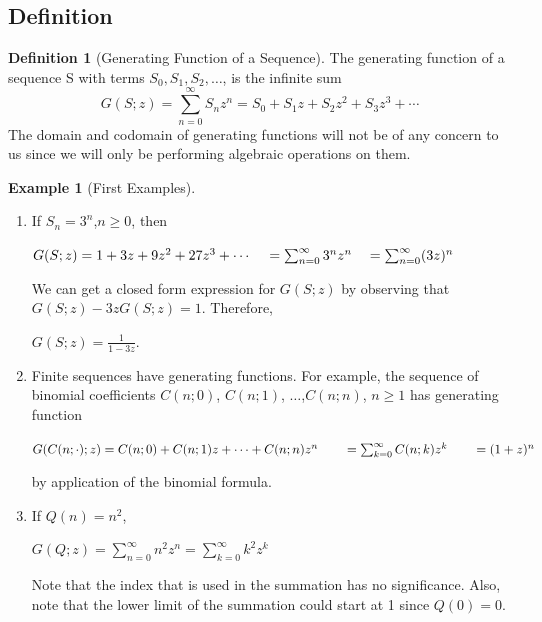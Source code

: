 \documentclass[10pt,]{book}
\theoremstyle{plain}
\theoremstyle{definition}
\newtheorem{definition}[theorem]{Definition}
\theoremstyle{definition}
\theoremstyle{definition}
\newtheorem{example}[theorem]{Example}
\theoremstyle{definition}
\numberwithin{equation}{section}
\begin{document}
\subsection[Definition]{Definition}\label{ss-what-is-a-generating-function}
\begin{definition}[Generating Function of a Sequence]\label{def-generating-function}
\label{notation-6}
The generating function of a sequence S with terms \(S_0,S_1 ,S_2, \dots \),  is the infinite sum
 \[G(S;z)=\sum_{n=0}^{\infty} S_n z^n=S_0+S_1 z+S_2 z^2+S_3 z^3+\cdots\]
The domain and codomain of generating functions will not be of any concern to us since we will only be performing algebraic operations on them.%
\end{definition}
\begin{example}[First Examples]\label{ex-first-gf-examples}
\leavevmode%
\begin{enumerate}[label=\alph*]
\item\hypertarget{li-62}{} If \(S_n = 3^n\),\(n \geq  0\), then

\(G(S;z) = 1 + 3z + 9z^2 + 27z^3 +\cdots \\
\\
\quad =\sum_{n=0}^{\infty} 3^n z^n\\
\\
\quad =\sum_{n=0}^{\infty} (3 z)^n\)

We can get a closed form expression for \(G(S;z)\) by observing that \(G(S;z) - 3z G(S;z) = 1\). Therefore,

\(G(S;z) =\frac{1}{1-3 z}\).%
\item\hypertarget{li-63}{}Finite sequences have generating functions. For example, the sequence of binomial coefficients \(C(n; 0)\), \(C(n; 1)\), \(\ldots\),\(C(n;
n)\), \(n \geq  1\) has generating function

\(G(C(n; \cdot ); z) = C(n; 0) + C(n; 1)z +\cdots  + C(n; n)z^n\\
\\
\quad \quad = \sum_{k=0}^{\infty} C(n;k) z^k\\
\\
\quad \quad =(1+z)^n\)

by application of the binomial formula.%
\item\hypertarget{li-64}{} If \(Q(n) = n^2\),

\(G(Q;z)=\sum_{n=0}^{\infty} n^2 z^n=\sum_{k=0}^{\infty} k^2 z^k\)

Note that the index that is used in the summation has no significance. Also, note that the lower limit of the summation could start at 1 since \(Q(0)=0\).%
\end{enumerate}
%
\end{example}
\typeout{************************************************}
\typeout{************************************************}
\end{document}
